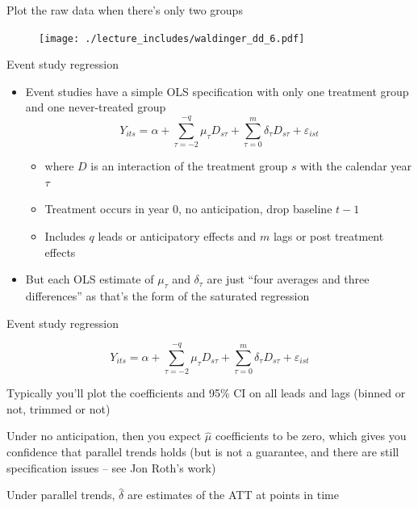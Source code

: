 \documentclass{beamer}
\begin{document}
\begin{frame}{Plot the raw data when there's only two groups}

	\begin{figure}
	\texttt{[image: ./lecture\_includes/waldinger\_dd\_6.pdf]}
	\end{figure}

\end{frame}



\begin{frame}{Event study regression}
	
	\begin{itemize}
	\item Event studies have a simple OLS specification with only one treatment group and one never-treated group $$Y_{its} = \alpha +  \sum_{\tau=-2}^{-q}\mu_{\tau}D_{s\tau} + \sum_{\tau=0}^m\delta_{\tau}D_{s\tau}+\varepsilon_{ist}$$
		\begin{itemize}
		\item where $D$ is an interaction of the treatment group $s$ with the calendar year $\tau$
		\item Treatment occurs in year 0, no anticipation, drop baseline $t-1$
		\item Includes $q$ leads or anticipatory effects and $m$ lags or post treatment effects
		\end{itemize}
	\item But each OLS estimate of $\mu_\tau$ and $\delta_\tau$ are just ``four averages and three differences'' as that's the form of the saturated regression
	\end{itemize}
\end{frame}

\begin{frame}{Event study regression}


$$Y_{its} = \alpha + \sum_{\tau=-2}^{-q}\mu_{\tau}D_{s\tau} + \sum_{\tau=0}^m\delta_{\tau}D_{s\tau}+\varepsilon_{ist}$$

\bigskip

Typically you'll plot the coefficients and 95\% CI on all leads and lags (binned or not, trimmed or not) 

\bigskip

Under no anticipation, then you expect $\widehat{\mu}$ coefficients to be zero, which gives you confidence that parallel trends holds (but is not a guarantee, and there are still specification issues -- see Jon Roth's work)

\bigskip

Under parallel trends, $\widehat{\delta}$ are estimates of the ATT at points in time

\end{frame}
\end{document}
